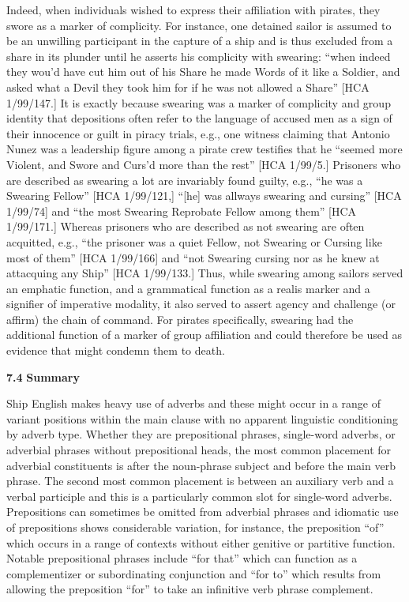 Indeed, when individuals wished to express their affiliation with pirates, they swore as a marker of complicity. For instance, one detained sailor is assumed to be an unwilling participant in the capture of a ship and is thus excluded from a share in its plunder until he asserts his complicity with swearing: “when indeed they wou’d have cut him out of his Share he made Words of it like a Soldier, and asked what a Devil they took him for if he was not allowed a Share” [HCA 1/99/147.] It is exactly because swearing was a marker of complicity and group identity that depositions often refer to the language of accused men as a sign of their innocence or guilt in piracy trials, e.g., one witness claiming that Antonio Nunez was a leadership figure among a pirate crew testifies that he “seemed more Violent, and Swore and Curs’d more than the rest” [HCA 1/99/5.] Prisoners who are described as swearing a lot are invariably found guilty, e.g., “he was a Swearing Fellow” [HCA 1/99/121,] “[he] was allways swearing and cursing” [HCA 1/99/74] and “the most Swearing Reprobate Fellow among them” [HCA 1/99/171.] Whereas prisoners who are described as not swearing are often acquitted, e.g., “the prisoner was a quiet Fellow, not Swearing or Cursing like most of them” [HCA 1/99/166] and “not Swearing cursing nor as he knew at attacquing any Ship” [HCA 1/99/133.] Thus, while swearing among sailors served an emphatic function, and a grammatical function as a realis marker and a signifier of imperative modality, it also served to assert agency and challenge (or affirm) the chain of command.  For pirates specifically, swearing had the additional function of a marker of group affiliation and could therefore be used as evidence that might condemn them to death. 

\textbf{7.4} \textbf{Summary}

  Ship English makes heavy use of adverbs and these might occur in a range of variant positions within the main clause with no apparent linguistic conditioning by adverb type. Whether they are prepositional phrases, single-word adverbs, or adverbial phrases without prepositional heads, the most common placement for adverbial constituents is after the noun-phrase subject and before the main verb phrase. The second most common placement is between an auxiliary verb and a verbal participle and this is a particularly common slot for single-word adverbs. Prepositions can sometimes be omitted from adverbial phrases and idiomatic use of prepositions shows considerable variation, for instance, the preposition “of” which occurs in a range of contexts without either genitive or partitive function. Notable prepositional phrases include “for that” which can function as a complementizer or subordinating conjunction and “for to” which results from allowing the preposition “for” to take an infinitive verb phrase complement. 

